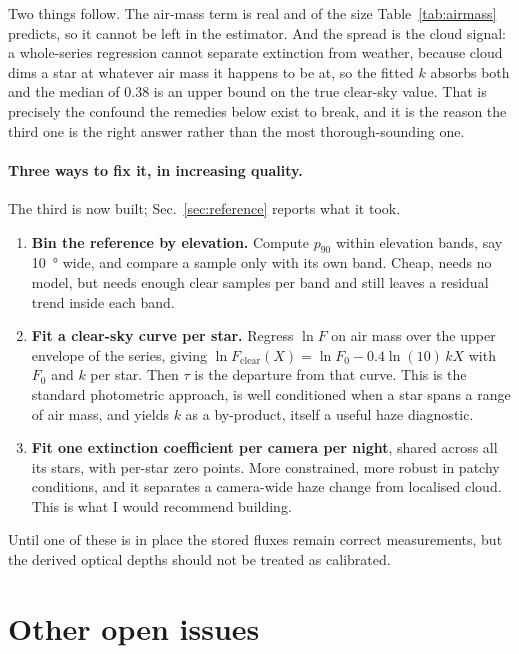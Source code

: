 \documentclass[11pt,a4paper]{article}
\begin{document}
Two things follow. The air-mass term is real and of the size
Table~\ref{tab:airmass} predicts, so it cannot be left in the estimator. And the
spread is the cloud signal: a whole-series regression cannot separate extinction
from weather, because cloud dims a star at whatever air mass it happens to be
at, so the fitted $k$ absorbs both and the median of \num{0.38} is an upper
bound on the true clear-sky value. That is precisely the confound the remedies
below exist to break, and it is the reason the third one is the right answer
rather than the most thorough-sounding one.

\paragraph{Three ways to fix it, in increasing quality.} The third is now
built; Sec.~\ref{sec:reference} reports what it took.
\begin{enumerate}
  \item \textbf{Bin the reference by elevation.} Compute $p_{90}$ within
    elevation bands, say \SI{10}{\degree} wide, and compare a sample only with
    its own band. Cheap, needs no model, but needs enough clear samples per band
    and still leaves a residual trend inside each band.
  \item \textbf{Fit a clear-sky curve per star.} Regress
    $\ln F$ on air mass over the upper envelope of the series, giving
    $\ln F_{\mathrm{clear}}(X) = \ln F_0 - 0.4\ln(10)\,kX$ with $F_0$ and $k$
    per star. Then $\tau$ is the departure from that curve. This is the standard
    photometric approach, is well conditioned when a star spans a range of air
    mass, and yields $k$ as a by-product, itself a useful haze diagnostic.
  \item \textbf{Fit one extinction coefficient per camera per night}, shared
    across all its stars, with per-star zero points. More constrained, more
    robust in patchy conditions, and it separates a camera-wide haze change from
    localised cloud. This is what I would recommend building.
\end{enumerate}
Until one of these is in place the stored fluxes remain correct measurements,
but the derived optical depths should not be treated as calibrated.

\section{Other open issues}
\end{document}
